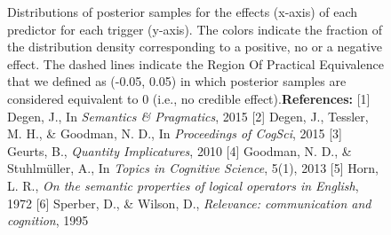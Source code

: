 \documentclass[11pt,letterpaper]{article}
\begin{document}
\begin{figure}   
    \caption{Distributions of posterior samples for the effects (x-axis) of each predictor for each trigger (y-axis). The colors indicate the fraction of the distribution density corresponding to a positive, no or a negative effect. The dashed lines indicate the Region Of Practical Equivalence that we defined as (-0.05, 0.05) in which posterior samples are considered equivalent to 0 (i.e., no credible effect).\newline \textbf{References:} [1] Degen, J., In \textit{Semantics \& Pragmatics}, 2015 [2] Degen, J., Tessler, M. H., \& Goodman, N. D., In \textit{Proceedings of CogSci}, 2015 [3] Geurts, B., \textit{Quantity Implicatures}, 2010 [4] Goodman, N. D., \& Stuhlm\"uller, A., In \textit{Topics in Cognitive Science}, 5(1), 2013 [5] Horn, L. R., \textit{On the semantic properties of logical operators in English}, 1972 [6] Sperber, D., \& Wilson, D., \textit{Relevance: communication and cognition}, 1995}
    \label{posteriors}
\end{figure}
\end{document}
